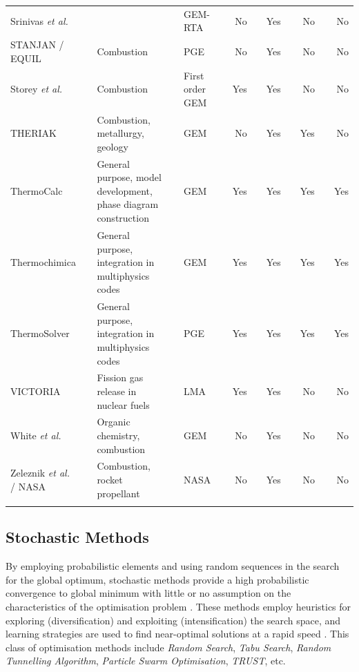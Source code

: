 \begin{landscape}
\begin{longtable}{@{}p{}cp{}clcrcrcrcr@{}}
		Srinivas \textit{et al.} \cite{Srinivas06} && {} && GEM-RTA && No && Yes && No && No\\
		STANJAN / EQUIL \cite{Reynolds86} && {Combustion} && PGE && No && Yes && No && No\\
		Storey \textit{et al.} \cite{Storey:1964aa} && {Combustion} && First order GEM && Yes && Yes && No && No\\
		THERIAK \cite{DECAPITANI19872639} && {Combustion, metallurgy, geology} && GEM && No && Yes && Yes && No\\
		ThermoCalc \cite{ANDERSSON2002273} && {General purpose, model development, phase diagram construction} && GEM && Yes && Yes && Yes && Yes\\
		Thermochimica \cite{Piro13} && {General purpose, integration in multiphysics codes} && GEM && Yes && Yes && Yes && Yes\\
		ThermoSolver \cite{Piro11b} && {General purpose, integration in multiphysics codes} && PGE && Yes && Yes && Yes && Yes\\
		VICTORIA \cite{Heams:1992aa} && {Fission gas release in nuclear fuels} && LMA && Yes && Yes && No && No\\
		White \textit{et al.} \cite{White58a} && {Organic chemistry, combustion} && GEM && No && Yes && No && No\\
		Zeleznik \textit{et al.} / NASA \cite{Zeleznik:1968aa} && {Combustion, rocket propellant} && NASA && No && Yes && No && No\\
		\bottomrule
		\label{tab:gemreview}
	\end{longtable}
\end{landscape}
\restoregeometry


	\subsection{Stochastic Methods}
	By employing probabilistic elements and using random sequences in the search for the global optimum, stochastic methods  provide a high probabilistic convergence to global minimum with little or no assumption on the characteristics of the optimisation problem \cite{Rangaiah:2010aa}. These methods employ heuristics for exploring (diversification) and exploiting (intensification) the search space, and learning strategies are used to find near-optimal solutions at a rapid speed \cite{Blum:2003aa}. This class of optimisation methods include \emph{Random Search}, \emph{Tabu Search}, \emph{Random Tunnelling Algorithm}, \emph{Particle Swarm Optimisation}, \emph{TRUST}, etc.

